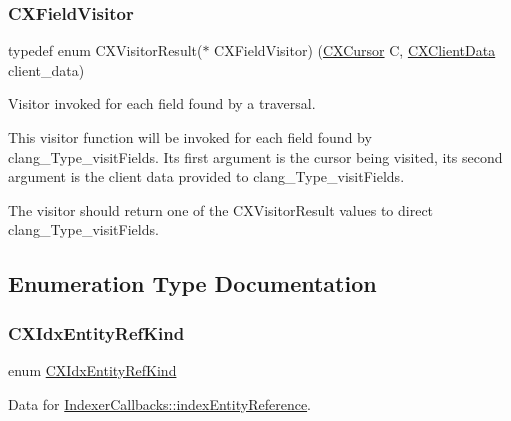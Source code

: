 \subsubsection{\texorpdfstring{C\+X\+Field\+Visitor}{CXFieldVisitor}}
{\footnotesize\ttfamily typedef enum C\+X\+Visitor\+Result($\ast$ C\+X\+Field\+Visitor) (\hyperlink{structCXCursor}{C\+X\+Cursor} C, \hyperlink{group__CINDEX_gacfa40c3de26d228c0d898403c2c21612}{C\+X\+Client\+Data} client\+\_\+data)}



Visitor invoked for each field found by a traversal. 

This visitor function will be invoked for each field found by {\ttfamily clang\+\_\+\+Type\+\_\+visit\+Fields}. Its first argument is the cursor being visited, its second argument is the client data provided to {\ttfamily clang\+\_\+\+Type\+\_\+visit\+Fields}.

The visitor should return one of the {\ttfamily C\+X\+Visitor\+Result} values to direct {\ttfamily clang\+\_\+\+Type\+\_\+visit\+Fields}. 

\subsection{Enumeration Type Documentation}
\mbox{\label{group__CINDEX__HIGH_ga4158d96205b540d3ef4992cf6689c2aa}} 
\subsubsection{\texorpdfstring{C\+X\+Idx\+Entity\+Ref\+Kind}{CXIdxEntityRefKind}}
{\footnotesize\ttfamily enum \hyperlink{group__CINDEX__HIGH_ga4158d96205b540d3ef4992cf6689c2aa}{C\+X\+Idx\+Entity\+Ref\+Kind}}



Data for \hyperlink{structIndexerCallbacks_a6d93809e7743a590beafa0387ac145dc}{Indexer\+Callbacks\+::index\+Entity\+Reference}. 

